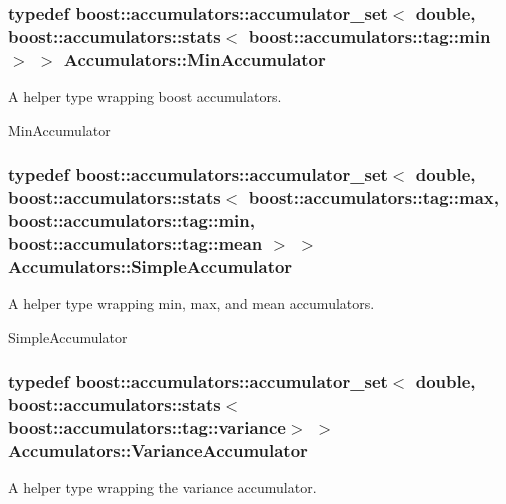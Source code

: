 \subsubsection[{\texorpdfstring{Min\+Accumulator}{MinAccumulator}}]{\setlength{\rightskip}{0pt plus 5cm}typedef boost\+::accumulators\+::accumulator\+\_\+set$<$ double, boost\+::accumulators\+::stats$<$ boost\+::accumulators\+::tag\+::min $>$ $>$ {\bf Accumulators\+::\+Min\+Accumulator}}\hypertarget{namespaceAccumulators_a475b123bb5929d13a2f78b40f43a1257}{}\label{namespaceAccumulators_a475b123bb5929d13a2f78b40f43a1257}


A helper type wrapping boost accumulators. 

Min\+Accumulator 
\subsubsection[{\texorpdfstring{Simple\+Accumulator}{SimpleAccumulator}}]{\setlength{\rightskip}{0pt plus 5cm}typedef boost\+::accumulators\+::accumulator\+\_\+set$<$ double, boost\+::accumulators\+::stats$<$ boost\+::accumulators\+::tag\+::max, boost\+::accumulators\+::tag\+::min, boost\+::accumulators\+::tag\+::mean $>$ $>$ {\bf Accumulators\+::\+Simple\+Accumulator}}\hypertarget{namespaceAccumulators_aed31f3acda76edc1d58c2bcb479a7aec}{}\label{namespaceAccumulators_aed31f3acda76edc1d58c2bcb479a7aec}


A helper type wrapping min, max, and mean accumulators. 

Simple\+Accumulator 
\subsubsection[{\texorpdfstring{Variance\+Accumulator}{VarianceAccumulator}}]{\setlength{\rightskip}{0pt plus 5cm}typedef boost\+::accumulators\+::accumulator\+\_\+set$<$ double, boost\+::accumulators\+::stats$<$ boost\+::accumulators\+::tag\+::variance$>$ $>$ {\bf Accumulators\+::\+Variance\+Accumulator}}\hypertarget{namespaceAccumulators_aa858a2eb0c818655fa5d66012dd41b09}{}\label{namespaceAccumulators_aa858a2eb0c818655fa5d66012dd41b09}


A helper type wrapping the variance accumulator. 

